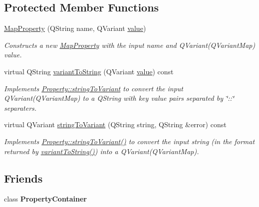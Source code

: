 \subsection*{Protected Member Functions}
\begin{DoxyCompactItemize}
\item 
\hypertarget{class_picto_1_1_map_property_a0090c633f3161dd21310dd20db293ab9}{\hyperlink{class_picto_1_1_map_property_a0090c633f3161dd21310dd20db293ab9}{Map\-Property} (Q\-String name, Q\-Variant \hyperlink{class_picto_1_1_property_a69540c9d4f9a4b0b128b4c6a876d67ca}{value})}\label{class_picto_1_1_map_property_a0090c633f3161dd21310dd20db293ab9}

\begin{DoxyCompactList}\small\item\em Constructs a new \hyperlink{class_picto_1_1_map_property}{Map\-Property} with the input name and Q\-Variant(\-Q\-Variant\-Map) value. \end{DoxyCompactList}\item 
virtual Q\-String \hyperlink{class_picto_1_1_map_property_a694260e6826e120bd4dede65ba259432}{variant\-To\-String} (Q\-Variant \hyperlink{class_picto_1_1_property_a69540c9d4f9a4b0b128b4c6a876d67ca}{value}) const 
\begin{DoxyCompactList}\small\item\em Implements \hyperlink{class_picto_1_1_property_a97d52011d6db190c5c28a21d76ac1d3b}{Property\-::string\-To\-Variant} to convert the input Q\-Variant(\-Q\-Variant\-Map) to a Q\-String with key value pairs separated by \char`\"{}\-::\char`\"{} separaters. \end{DoxyCompactList}\item 
virtual Q\-Variant \hyperlink{class_picto_1_1_map_property_ac190f305445034b64a3f4c2935fda191}{string\-To\-Variant} (Q\-String string, Q\-String \&error) const 
\begin{DoxyCompactList}\small\item\em Implements \hyperlink{class_picto_1_1_property_a97d52011d6db190c5c28a21d76ac1d3b}{Property\-::string\-To\-Variant()} to convert the input string (in the format returned by \hyperlink{class_picto_1_1_map_property_a694260e6826e120bd4dede65ba259432}{variant\-To\-String()}) into a Q\-Variant(\-Q\-Variant\-Map). \end{DoxyCompactList}\end{DoxyCompactItemize}
\subsection*{Friends}
\begin{DoxyCompactItemize}
\item 
\hypertarget{class_picto_1_1_map_property_a7ff968ca40027b2b0500a9260b463e3a}{class {\bfseries Property\-Container}}\label{class_picto_1_1_map_property_a7ff968ca40027b2b0500a9260b463e3a}

\end{DoxyCompactItemize}
